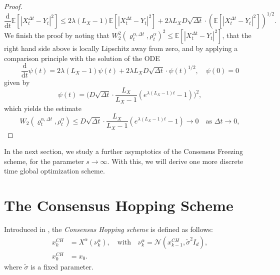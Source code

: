 \documentclass[reqno]{amsart}
\numberwithin{algorithm}{section}
\newcommand{\diff}{\mathrm{d}}
\newcommand{\EE}{{\mathbb E}}
\newcommand{\Xalpha}{{X^\alpha}}
\newcommand{\Normal}{\mathcal{N}}
\begin{document}
{\begin{proof}
    \begin{equation}
        \frac{\diff}{\diff t} \EE[|X_t^{\Delta t} - Y_t|^2] \leq 2 \lambda (L_X - 1) \EE[|X_t^{\Delta t} - Y_t|^2] + 2 \lambda L_X D \sqrt{\Delta t} \cdot (\EE[|X_t^{\Delta t} - Y_t|^2])^{1/2}.
    \end{equation}
    We finish the proof by noting that $W^2_2(\varrho_{t}^{\alpha,\Delta t}, \rho^\alpha_t)^2 \leq \EE[|X_t^{\Delta t} - Y_t|^2]$, that the right hand side above is locally Lipschitz away from zero, and by applying a comparison principle with the solution of the ODE
    \begin{equation*}
        \frac{\diff}{\diff t} \psi(t) = 2 \lambda (L_X - 1) \psi(t) + 2 \lambda L_X D \sqrt{\Delta t} \cdot \psi(t)^{1/2}, \quad \psi(0) = 0
    \end{equation*}
    given by
    \begin{equation*}
        \psi(t) = \Big(D \sqrt{\Delta t} \cdot \frac{L_X}{L_X - 1} (e^{\lambda (L_X - 1) t} - 1)\Big)^2,
    \end{equation*}
    which yields the estimate
    \begin{equation}
        W_2(\varrho_{t}^{\alpha,\Delta t}, \rho^\alpha_t) \leq D \sqrt{\Delta t} \cdot \frac{L_X}{L_X - 1} (e^{\lambda (L_X - 1) t} - 1) \to 0 \quad \text{as } \Delta t \to 0,
    \end{equation}
\end{proof}


In the next section, we study a further asymptotics of the Consensus Freezing scheme, for the parameter $s \to \infty$. With this, we will derive one more discrete time global optimization scheme.

\section{The Consensus Hopping Scheme}\label{sec:HS}
Introduced in \cite{riedl_gradient_2023}, the \emph{Consensus Hopping scheme} is defined as follows:
\begin{equation}\tag{CH}\label{eq:consensus-hopping}
    \begin{split}
        x_k^{CH} &= \Xalpha(\nu_k^\alpha), \quad \text{with} \quad \nu_k^\alpha = \Normal(x_{k-1}^{CH}, \tilde{\sigma}^2 I_d), \\
        x_0^{CH} &= x_0.
    \end{split}
\end{equation}
where $\tilde{\sigma}$ is a fixed parameter.

}
\end{document}
